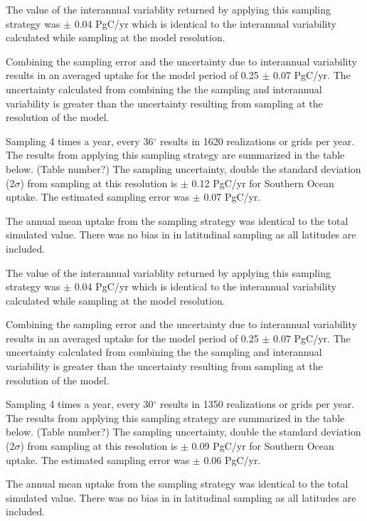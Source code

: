 \documentclass[11pt, a4paper]{article}
\numberwithin{figure}{section}
\numberwithin{table}{section}
\begin{document}
The value of the interannual variablity returned by applying this
sampling strategy was $\pm$ 0.04 PgC/yr which is identical to the 
interannual variability calculated while sampling at the model 
resolution. 

Combining the sampling error and the uncertainty due to interannual
variability results in an averaged uptake for the model period of 
0.25 $\pm$ 0.07 PgC/yr.
The uncertainty calculated from combining the the sampling and 
interannual variability is greater than the uncertainty resulting from
sampling at the resolution of the model.


Sampling 4 times a year, every 36$^{\circ}$ results in 1620 realizations 
or grids per year. The results from applying this sampling strategy are
summarized in the table below. (Table number?)
The sampling uncertainty, double the standard deviation (2$\sigma$) 
from sampling at this resolution is
$\pm$ 0.12 PgC/yr for Southern Ocean uptake. 
The estimated sampling error was $\pm$ 0.07 PgC/yr. %

The annual mean uptake from the sampling strategy was identical to 
the total simulated value. There was no bias in in latitudinal sampling
as all latitudes are included.

The value of the interannual variablity returned by applying this
sampling strategy was $\pm$ 0.04 PgC/yr which is identical to the 
interannual variability calculated while sampling at the model 
resolution. 

Combining the sampling error and the uncertainty due to interannual
variability results in an averaged uptake for the model period of 
0.25 $\pm$ 0.07 PgC/yr.
The uncertainty calculated from combining the the sampling and 
interannual variability is greater than the uncertainty resulting from
sampling at the resolution of the model.


Sampling 4 times a year, every 30$^{\circ}$ results in 1350 realizations 
or grids per year. The results from applying this sampling strategy are
summarized in the table below. (Table number?)
The sampling uncertainty, double the standard deviation (2$\sigma$) 
from sampling at this resolution is
$\pm$ 0.09 PgC/yr for Southern Ocean uptake.
The estimated sampling error was 
$\pm$ 0.06 PgC/yr. %

The annual mean uptake from the sampling strategy was identical to 
the total simulated value. There was no bias in in latitudinal sampling
as all latitudes are included.
\end{document}
